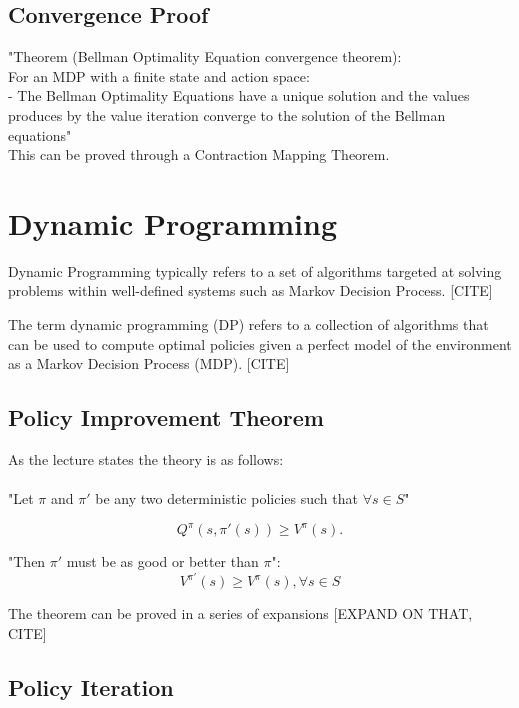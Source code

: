 \subsection{Convergence Proof}
"Theorem (Bellman Optimality Equation convergence theorem):\\

For an MDP with a finite state and action space:\\
 - The Bellman Optimality Equations have a unique solution and the values produces by the value iteration converge to the solution of  the Bellman equations"\\
 
 This can be proved through a Contraction Mapping Theorem.

\section{Dynamic Programming}
Dynamic Programming typically refers to a set of algorithms targeted at solving problems within well-defined systems such as Markov Decision Process. [CITE] 

The term dynamic programming (DP) refers to a collection of algorithms that can be used to compute optimal policies given a perfect model of the environment as a Markov Decision Process (MDP). [CITE]

\subsection{Policy Improvement Theorem}

As the lecture states the theory is as follows:\\\\

"Let $\pi$ and $\pi'$ be any two deterministic policies such that $\forall s \in S$"

\begin{equation}
    Q^{\pi}(s, \pi'(s)) \geq V^{\pi}(s).
\end{equation}

"Then $\pi'$ must be as good or better than $\pi$":
\begin{equation}
    V^{\pi'}(s) \geq V^{\pi}(s), \forall s \in S
\end{equation}

The theorem can be proved in a series of expansions [EXPAND ON THAT, CITE]

\subsection{Policy Iteration}

